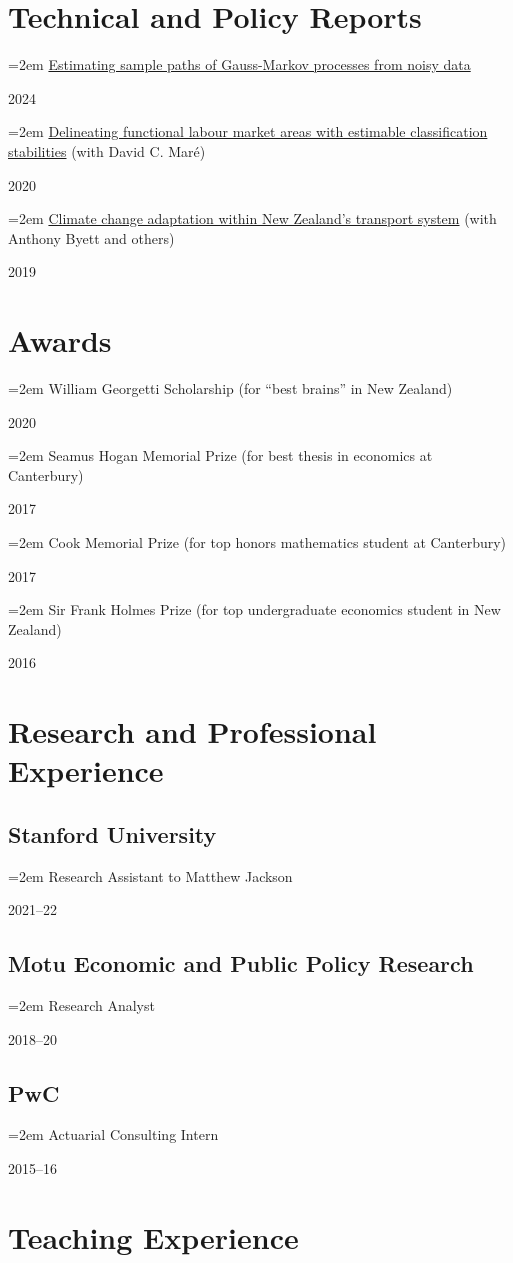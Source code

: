 \documentclass[11pt,oneside]{memoir}
\newcommand{\datedentry}[2]{\par\parbox[t]{0.9\linewidth}{\strut\raggedright\hangindent=2em #2\strut}\hfill#1}
\begin{document}
\section{Technical and Policy Reports}

\datedentry{2024}{\href{https://arxiv.org/abs/2404.00784}{Estimating sample paths of Gauss-Markov processes from noisy data}}
\datedentry{2020}{\href{https://www.iza.org/publications/dp/13642}{Delineating functional labour market areas with estimable classification stabilities} (with David C. Maré)}
\datedentry{2019}{\href{https://motu.nz/assets/Documents/our-work/environment/climate-change-impacts/Transport-Dialogue-Report.pdf}{Climate change adaptation within New Zealand's transport system} (with Anthony Byett and others)}

\section{Awards}

\datedentry{2020}{William Georgetti Scholarship (for ``best brains'' in New Zealand)}
\datedentry{2017}{Seamus Hogan Memorial Prize (for best thesis in economics at Canterbury)}
\datedentry{2017}{Cook Memorial Prize (for top honors mathematics student at Canterbury)}
\datedentry{2016}{Sir Frank Holmes Prize (for top undergraduate economics student in New Zealand)}

\section{Research and Professional Experience}

\subsection{Stanford University}
\datedentry{2021--22}{Research Assistant to Matthew Jackson}

\subsection{Motu Economic and Public Policy Research}
\datedentry{2018--20}{Research Analyst}

\subsection{PwC}
\datedentry{2015--16}{Actuarial Consulting Intern}

\section{Teaching Experience}
\end{document}
